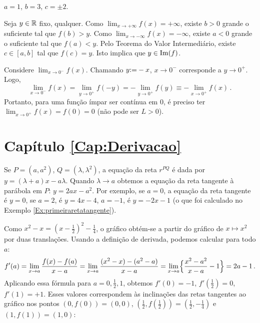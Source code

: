 \begin{Solution}{5.7}
$a=1$, $b=3$, $c=\pm 2$.
\end{Solution}
\begin{Solution}{5.8}
Seja $y\in \mathbb{R}$ fixo, qualquer. Como $\lim_{x\to
+\infty}f(x)=+\infty$, existe $b>0$ grande o suficiente tal que
$f(b)>y$.
Como $\lim_{x\to -\infty}f(x)=-\infty$, existe $a<0$ grande o
suficiente tal que $f(a)<y$.
Pelo Teorema do Valor Intermediário, existe $c\in [a,b]$ tal que
$f(c)=y$. Isto implica que $y\in \operatorname{Im}(f)$.
\end{Solution}
\begin{Solution}{5.9}
Considere $\lim_{x\to 0^-}f(x)$. Chamando $y{:=} -x$, $x\to 0^-$ corresponde
a $y\to 0^+$.
Logo, $$\lim_{x\to 0^-}f(x)=\lim_{y\to 0^+}f(-y)=-\lim_{y\to 0^+}f(y)\equiv-
\lim_{x\to 0^+}f(x)\,.$$
Portanto, para uma função ímpar ser contínua em $0$, é preciso ter
$\lim_{x\to 0^+}f(x)=f(0)=0$ (não pode ser $L>0$).
\end{Solution}
\protect \section *{Capítulo \ref {Cap:Derivacao}}
\begin{Solution}{6.1}
Se $P=(a,a^2)$, $Q=(\lambda,\lambda^2)$, a equação da reta $r^{PQ}$ é dada por
$y=(\lambda+a)x-a\lambda$. Quando $\lambda\to a$ obtemos
a equação da reta tangente à parábola em $P$: $y=2a x-a^2$.
Por exemplo, se $a=0$, a equação da reta tangente é $y=0$, se $a=2$, é
$y=4x-4$,
$a=-1$, é $y=-2x-1$ (o que foi calculado no Exemplo
\ref{Ex:primeiraretatangente}).
\end{Solution}
\begin{Solution}{6.2}
Como $x^2-x=(x-\frac12)^2-\frac14$, o gráfico obtém-se a partir do gráfico de
$x\mapsto x^2$ por duas translações.
Usando a definição de derivada, podemos calcular para todo $a$:
$$f'(a)=\lim_{x\to a}\frac{f(x)-f(a)}{x-a}
=\lim_{x\to a}\frac{(x^2-x)-(a^2-a)}{x-a}=
\lim_{x\to a}\Bigl\{\frac{x^2-a^2}{x-a}-1\Bigr\}=2a-1\,.$$
Aplicando essa fórmula para $a=0,\frac12,1$, obtemos $f'(0)=-1$,
$f'(\frac12)=0$, $f'(1)=+1$.
Esses valores correspondem às inclinações das retas
tangentes ao gráfico nos pontos $(0,f(0))=(0,0)$,
$(\frac12,f(\frac12))=(\frac12,-\frac14)$ e $(1,f(1))=(1,0)$:
\begin{center}
\begin{bmlimage}\end{bmlimage}
\end{center}
\end{Solution}
